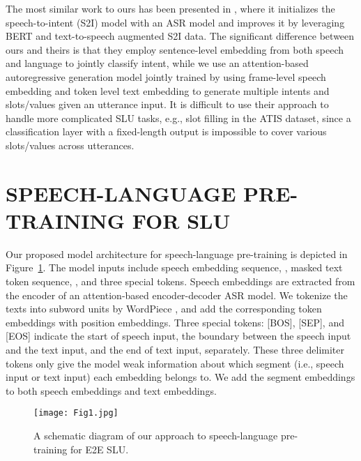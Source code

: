 \documentclass{article}
\begin{document}
The most similar work to ours has been presented in \cite{9053281,denisov2020pretrained}, where it initializes the speech-to-intent (S2I) model with an ASR model and improves it by leveraging BERT and text-to-speech augmented S2I data. The significant difference between ours and theirs is that they employ sentence-level embedding from both speech and language to jointly classify intent, while we use an attention-based autoregressive generation model jointly trained by using frame-level speech embedding and token level text embedding to generate multiple intents and slots/values given an utterance input. It is difficult to use their approach to handle more complicated SLU tasks, e.g., slot filling in the ATIS dataset, since a classification layer with a fixed-length output is impossible to cover various slots/values across utterances. 

\section{SPEECH-LANGUAGE PRE-TRAINING FOR SLU}
\label{sec:PST_SLU}

Our proposed model architecture for speech-language pre-training is depicted in Figure~\ref{fig:diagram}. The model inputs include speech embedding sequence, , masked text token sequence, , and three special tokens. Speech embeddings are extracted from the encoder of an attention-based encoder-decoder ASR model. We tokenize the texts into subword units by WordPiece \cite{DBLP:journals/corr/WuSCLNMKCGMKSJL16}, and add the corresponding token embeddings with position embeddings. Three special tokens: [BOS], [SEP], and [EOS] indicate the start of speech input, the boundary between the speech input and the text input, and the end of text input, separately. These three delimiter tokens only give the model weak information about which segment (i.e., speech input or text input) each embedding belongs to. We add the segment embeddings to both speech embeddings and text embeddings. 

\begin{figure}[htb]

\begin{minipage}[b]{1.0\linewidth}
  \centering
  \centerline{\texttt{[image: Fig1.jpg]}}
 \vspace{-0.3cm}
\end{minipage}
\caption{A schematic diagram of our approach to speech-language pre-training for E2E SLU.}
\label{fig:diagram}
\end{figure}
\end{document}
